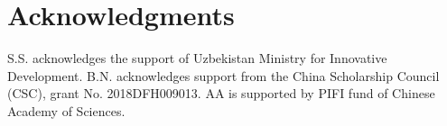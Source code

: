 \documentclass[showpacs,twocolumn,superscriptaddress]{revtex4}
\begin{document}
\section*{Acknowledgments}
%
S.S. acknowledges the support of Uzbekistan Ministry for Innovative Development. B.N. acknowledges support from the China Scholarship Council (CSC), grant No. 2018DFH009013. AA is supported by PIFI fund of Chinese Academy of Sciences. 
%


\appendix






\end{document}
